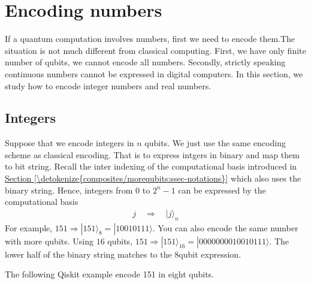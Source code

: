 \documentclass[letterpaper,10pt,english]{jupyterBook}
\begin{document}
\section{Encoding numbers}
\label{\detokenize{composites/numbers:encoding-numbers}}\label{\detokenize{composites/numbers:sec-numbers}}\label{\detokenize{composites/numbers::doc}}
\sphinxAtStartPar
If a quantum computation involves numbers, first we need to encode them.The situation is not much different from classical computing.  First, we have only finite number of qubits, we cannot encode all numbers.  Secondly, strictly speaking continuous numbers cannot be expressed in digital computers.  In this section, we study how to encode integer numbers and real numbers.


\subsection{Integers}
\label{\detokenize{composites/numbers:integers}}
\sphinxAtStartPar
Suppose that we encode integers in \(n\) qubits. We just use the same encoding scheme as classical encoding.   That is to express intgers in binary and map them to bit string. Recall the inter indexing of the computational basis introduced in \hyperref[\detokenize{composites/morequbits:ssec-notations}]{Section \ref{\detokenize{composites/morequbits:ssec-notations}}} which also uses the binary string. Hence, integers from \(0\) to \(2^n-1\) can be expressed by the computational basis
\begin{equation*}
\begin{split}
j \quad \Rightarrow \quad |j\rangle_n
\end{split}
\end{equation*}
\sphinxAtStartPar
For example, \(151 \Rightarrow |151\rangle_8 = |10010111\rangle\).  You can also encode the same number with more qubits. Using \(16\) qubits, \(151 \Rightarrow |151\rangle_{16} = |0000000010010111\rangle\).  The lower half of the binary string matches to the 8\sphinxhyphen{}qubit expression.

\sphinxAtStartPar
The following Qiskit example encode 151 in eight qubits.
\end{document}

